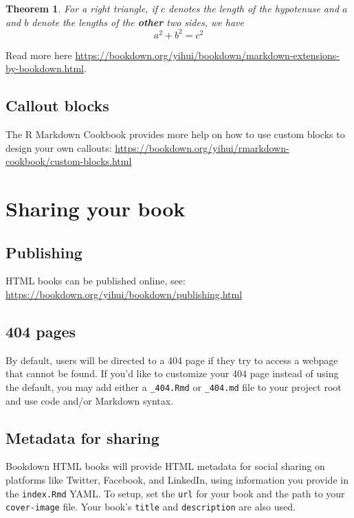 \documentclass[
]{book}
\newtheorem{theorem}{Theorem}[chapter]
\theoremstyle{definition}
\theoremstyle{definition}
\theoremstyle{definition}
\theoremstyle{definition}
\theoremstyle{remark}
\begin{document}
\begin{theorem}
\protect\hypertarget{thm:tri}{}\label{thm:tri}For a right triangle, if \(c\) denotes the \emph{length} of the hypotenuse
and \(a\) and \(b\) denote the lengths of the \textbf{other} two sides, we have
\[a^2 + b^2 = c^2\]
\end{theorem}

Read more here \url{https://bookdown.org/yihui/bookdown/markdown-extensions-by-bookdown.html}.

\section{Callout blocks}\label{callout-blocks}

The R Markdown Cookbook provides more help on how to use custom blocks to design your own callouts: \url{https://bookdown.org/yihui/rmarkdown-cookbook/custom-blocks.html}

\chapter{Sharing your book}\label{sharing-your-book}

\section{Publishing}\label{publishing}

HTML books can be published online, see: \url{https://bookdown.org/yihui/bookdown/publishing.html}

\section{404 pages}\label{pages}

By default, users will be directed to a 404 page if they try to access a webpage that cannot be found. If you'd like to customize your 404 page instead of using the default, you may add either a \texttt{\_404.Rmd} or \texttt{\_404.md} file to your project root and use code and/or Markdown syntax.

\section{Metadata for sharing}\label{metadata-for-sharing}

Bookdown HTML books will provide HTML metadata for social sharing on platforms like Twitter, Facebook, and LinkedIn, using information you provide in the \texttt{index.Rmd} YAML. To setup, set the \texttt{url} for your book and the path to your \texttt{cover-image} file. Your book's \texttt{title} and \texttt{description} are also used.
\end{document}
